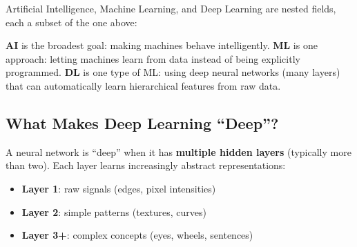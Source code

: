 \documentclass[11pt,a4paper]{article}
\begin{document}
Artificial Intelligence, Machine Learning, and Deep Learning are nested fields, each a subset of the one above:

\begin{center}
\end{center}

\begin{tcolorbox}[intuitionbox={Key Insight}]
\textbf{AI} is the broadest goal: making machines behave intelligently. \textbf{ML} is one approach: letting machines learn from data instead of being explicitly programmed. \textbf{DL} is one type of ML: using deep neural networks (many layers) that can automatically learn hierarchical features from raw data.
\end{tcolorbox}

\subsection{What Makes Deep Learning ``Deep''?}

A neural network is ``deep'' when it has \textbf{multiple hidden layers} (typically more than two). Each layer learns increasingly abstract representations:
\begin{itemize}[leftmargin=1.5em]
    \item \textbf{Layer 1}: raw signals (edges, pixel intensities)
    \item \textbf{Layer 2}: simple patterns (textures, curves)
    \item \textbf{Layer 3+}: complex concepts (eyes, wheels, sentences)
\end{itemize}
\end{document}
